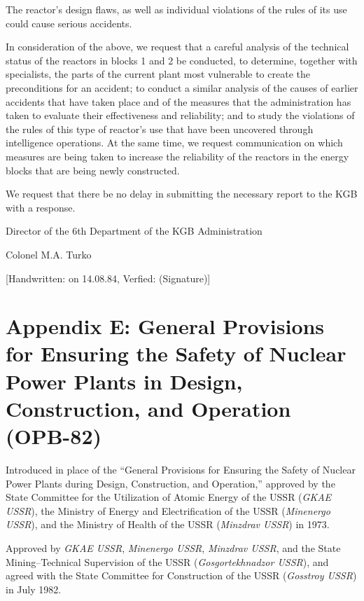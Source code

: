 \documentclass[openright]{bookest}
\begin{document}
The reactor's design flaws, as well as individual violations of the rules of its use could cause serious accidents.

In consideration of the above, we request that a careful analysis of the technical status of the reactors in blocks 1 and 2 be conducted, to determine, together with specialists, the parts of the current plant most vulnerable to create the preconditions for an accident; to conduct a similar analysis of the causes of earlier accidents that have taken place and of the measures that the administration has taken to evaluate their effectiveness and reliability; and to study the violations of the rules of this type of reactor's use that have been uncovered through intelligence operations. At the same time, we request communication on which measures are being taken to increase the reliability of the reactors in the energy blocks that are being newly constructed.

We request that there be no delay in submitting the necessary report to the KGB with a response.

\begin{flushright}\small{
Director of the 6th Department of the KGB Administration

Colonel M.A. Turko

[Handwritten: on 14.08.84, Verfied: (Signature)]
}\end{flushright}

\chapter*{Appendix E: General Provisions for Ensuring the Safety of Nuclear Power Plants in Design, Construction, and Operation (OPB-82)}

Introduced in place of the ``General Provisions for Ensuring the Safety of Nuclear Power Plants during Design, Construction, and Operation,'' approved by the State Committee for the Utilization of Atomic Energy of the USSR (\textit{GKAE USSR}), the Ministry of Energy and Electrification of the USSR (\textit{Minenergo USSR}), and the Ministry of Health of the USSR (\textit{Minzdrav USSR}) in 1973.

Approved by \textit{GKAE USSR}, \textit{Minenergo USSR}, \textit{Minzdrav USSR}, and the State Mining--Technical Supervision of the USSR (\textit{Gosgortekhnadzor USSR}), and agreed with the State Committee for Construction of the USSR (\textit{Gosstroy USSR}) in July 1982.
\end{document}
